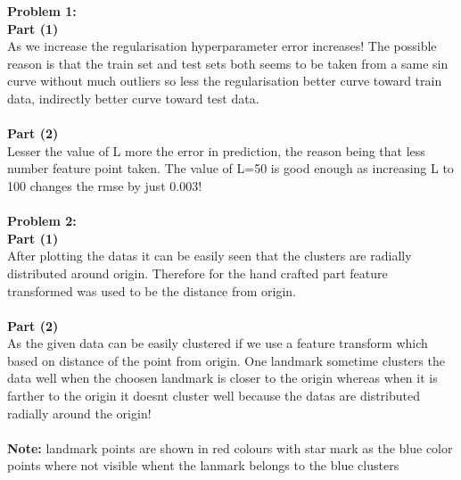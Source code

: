\documentclass[a4paper,11pt]{article}
\begin{document}
\begin{mlsolution}
\noindent
\textbf{Problem 1: \\Part (1)}\\
As we increase the regularisation hyperparameter error increases! The possible reason is that the train set and test sets both seems to be taken from a same sin curve without much outliers so less the regularisation better curve toward train data, indirectly better curve toward test data.\\ \\
\textbf{Part (2)}\\
Lesser the value of L more the error in prediction, the reason being that less number feature point taken. The value of L=50 is good enough as increasing L to 100 changes the rmse by just 0.003! \\ \\
\textbf{Problem 2: \\Part (1)}\\
After plotting the datas it can be easily seen that the clusters are radially distributed around origin. Therefore for the hand crafted part feature transformed was used to be the distance from origin.\\ \\
\textbf{Part (2)}\\
As the given data can be easily clustered if we use a feature transform which based on distance of the point from origin. One landmark sometime clusters the data well when the choosen landmark is closer to the origin whereas when it is farther to the origin it doesnt cluster well because the datas are distributed radially around the origin! \\ \\
\textbf{Note:} landmark points are shown in red colours with star mark as the blue color points where not visible whent the lanmark belongs to the blue clusters

\end{mlsolution}
\end{document}
